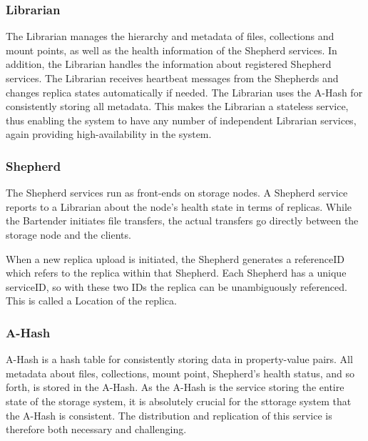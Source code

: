 \documentclass[final]{ieee}
\begin{document}
\subsubsection{Librarian}
\label{librarian}
The Librarian manages the hierarchy and metadata of
files, collections and mount points, as well as the health information of the Shepherd
services. In addition, the Librarian handles
the information about registered Shepherd services. The Librarian receives
heartbeat messages from the Shepherds and changes replica states automatically
if needed. The Librarian uses the A-Hash for consistently storing all metadata. This makes the
Librarian a stateless service, thus enabling the system to have any
number of independent
Librarian services, again providing high-availability in the
system.

\subsubsection{Shepherd}
\label{Shepherd}

The Shepherd services run as front-ends on storage nodes. A Shepherd
service reports to a Librarian about the 
node's health state in terms of replicas. While the Bartender initiates
file transfers, the actual transfers go directly between the storage node
and the clients.
 
When a new replica upload
is initiated, the Shepherd generates a referenceID which refers to
the replica within
that Shepherd. Each Shepherd has a unique serviceID, so with these two
IDs the replica can be unambiguously referenced. This is called a Location
of the replica. %



\subsubsection{A-Hash}
\label{Hash Algorithm}

A-Hash is a hash table for consistently storing data in property-value
pairs. All metadata about files, collections, mount point, Shepherd's
health status, and so forth, is stored in the A-Hash. As the A-Hash is
the service storing the entire state of the storage system, it is
absolutely crucial for the sttorage system that the A-Hash is
consistent. The distribution and replication of this service is
therefore both necessary and challenging.
\end{document}
